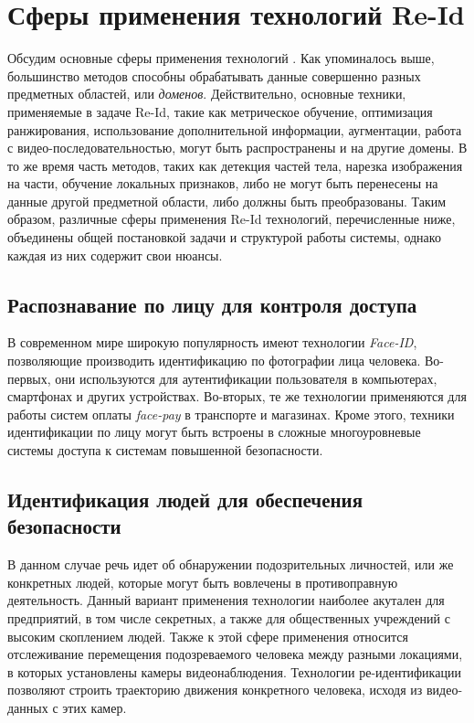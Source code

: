 \chapter{Сферы применения технологий Re-Id}
\label{ch:applications}

Обсудим основные сферы применения технологий \reid. Как упоминалось выше, большинство методов способны обрабатывать данные совершенно разных предметных областей, или \textit{доменов}. Действительно, основные техники, применяемые в задаче Re-Id, такие как метрическое обучение, оптимизация ранжирования, использование дополнительной информации, аугментации, работа с видео-последовательностью, могут быть распространены и на другие домены. В то же время часть методов, таких как детекция частей тела, нарезка изображения на части, обучение локальных признаков, либо не могут быть перенесены на данные другой предметной области, либо должны быть преобразованы. Таким образом, различные сферы применения Re-Id технологий, перечисленные ниже, объединены общей постановкой задачи и структурой работы системы, однако каждая из них содержит свои нюансы.

\section{Распознавание по лицу для контроля доступа}

В современном мире широкую популярность имеют технологии \textit{Face-ID}, позволяющие производить идентификацию по фотографии лица человека. Во-первых, они используются для аутентификации пользователя в компьютерах, смартфонах и других устройствах. Во-вторых, те же технологии применяются для работы систем оплаты \textit{face-pay} в транспорте и магазинах. Кроме этого, техники идентификации по лицу могут быть встроены в сложные многоуровневые системы доступа к системам повышенной безопасности.


\section{Идентификация людей для обеспечения безопасности}

В данном случае речь идет об обнаружении подозрительных личностей, или же конкретных людей, которые могут быть вовлечены в противоправную деятельность. Данный вариант применения технологии наиболее акутален для предприятий, в том числе секретных, а также для общественных учреждений с высоким скоплением людей. Также к этой сфере применения относится отслеживание перемещения подозреваемого человека между разными локациями, в которых установлены камеры видеонаблюдения. Технологии ре-идентификации позволяют строить траекторию движения конкретного человека, исходя из видео-данных с этих камер.



